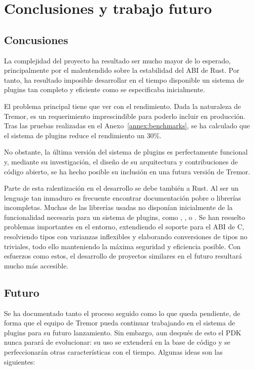 
\chapter{Conclusiones y trabajo futuro}

\section{Concusiones}

La complejidad del proyecto ha resultado ser mucho mayor de lo esperado,
principalmente por el malentendido sobre la estabilidad del ABI de Rust. Por
tanto, ha resultado imposible desarrollar en el tiempo disponible un sistema de
plugins tan completo y eficiente como se especificaba inicialmente.

El problema principal tiene que ver con el rendimiento. Dada la naturaleza de
Tremor, es un requerimiento imprescindible para poderlo incluir en producción.
Tras las pruebas realizadas en el Anexo~\ref{annex:benchmarks}, se ha calculado
que el sistema de plugins reduce el rendimiento un 30\%.

No obstante, la última versión del sistema de plugins es perfectamente funcional
y, mediante su investigación, el diseño de su arquitectura y contribuciones de
código abierto, se ha hecho posible su inclusión en una futura versión de
Tremor.

Parte de esta ralentización en el desarrollo se debe también a Rust. Al ser un
lenguaje tan inmaduro es frecuente encontrar documentación pobre o librerías
incompletas. Muchas de las librerías usadas no disponían inicialmente de la
funcionalidad necesaria para un sistema de plugins, como ,
,  o . Se han resuelto
problemas importantes en el entorno, extendiendo el soporte para el ABI de C,
resolviendo tipos con varianzas inflexibles y elaborando conversiones de tipos
no triviales, todo ello manteniendo la máxima seguridad y eficiencia posible.
Con esfuerzos como estos, el desarrollo de proyectos similares en el futuro
resultará mucho más accesible.

\section{Futuro}

Se ha documentado tanto el proceso seguido como lo que queda pendiente, de forma
que el equipo de Tremor pueda continuar trabajando en el sistema de plugins para
su futuro lanzamiento. Sin embargo, aun después de esto el PDK nunca parará de
evolucionar: su uso se extenderá en la base de código y se perfeccionarán otras
características con el tiempo. Algunas ideas son las siguientes:

